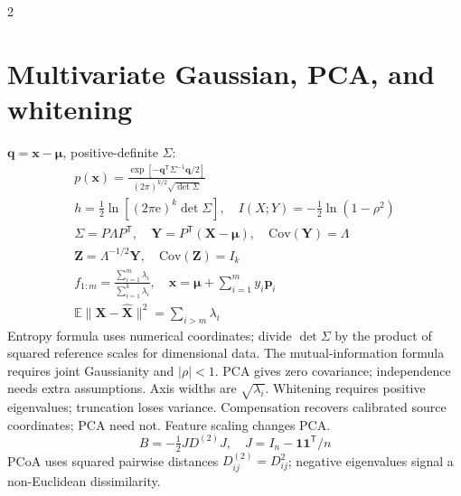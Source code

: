 \documentclass[10pt,a4paper]{scrartcl}
\newcommand{\ee}{\mathrm{e}}
\begin{document}
\begin{multicols}{2}
\section*{Multivariate Gaussian, PCA, and whitening}
$\mathbf q=\mathbf x-\boldsymbol\mu$, positive-definite $\Sigma$:
\begin{gather*}
p(\mathbf x)=\frac{\exp[-\mathbf q^{\mathsf T}\Sigma^{-1}\mathbf q/2]}{(2\pi)^{k/2}\sqrt{\det\Sigma}}\\
h=\tfrac12\ln[(2\pi\ee)^k\det\Sigma],\quad
I(X;Y)=-\tfrac12\ln(1-\rho^2)\\
\Sigma=P\Lambda P^{\mathsf T},\quad
\mathbf Y=P^{\mathsf T}(\mathbf X-\boldsymbol\mu),\quad\mathrm{Cov}(\mathbf Y)=\Lambda\\
\mathbf Z=\Lambda^{-1/2}\mathbf Y,\quad\mathrm{Cov}(\mathbf Z)=I_k\\
f_{1:m}=\frac{\sum_{i=1}^m\lambda_i}{\sum_{i=1}^k\lambda_i},\quad
\widehat{\mathbf x}=\boldsymbol\mu+\sum_{i=1}^my_i\mathbf p_i\\
\mathbb E\|\mathbf X-\widehat{\mathbf X}\|^2=\sum_{i>m}\lambda_i
\end{gather*}
Entropy formula uses numerical coordinates; divide $\det\Sigma$ by the product of squared reference scales for dimensional data. The mutual-information formula requires joint Gaussianity and $|\rho|<1$. PCA gives zero covariance; independence needs extra assumptions. Axis widths are $\sqrt{\lambda_i}$. Whitening requires positive eigenvalues; truncation loses variance. Compensation recovers calibrated source coordinates; PCA need not. Feature scaling changes PCA.
\begin{equation*}
B=-\tfrac12JD^{(2)}J,\quad J=I_n-\mathbf1\mathbf1^{\mathsf T}/n
\end{equation*}
PCoA uses squared pairwise distances $D^{(2)}_{ij}=D_{ij}^2$; negative eigenvalues signal a non-Euclidean dissimilarity.

\end{multicols}
\end{document}
